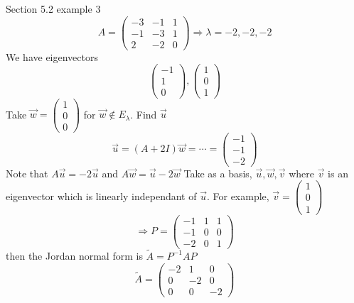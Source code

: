 \documentclass{article}
\numberwithin{equation}{section}
\begin{document}
\begin{eg}
    Section 5.2 example 3
    \[
        A = \begin{pmatrix}
            -3 & -1 & 1 \\
            -1 & -3 & 1 \\
            2 & -2 & 0
        \end{pmatrix} \Rightarrow \lambda = -2, -2, -2
    \]
    We have eigenvectors
    \[
        \begin{pmatrix}
            -1 \\ 1 \\ 0
        \end{pmatrix}, 
        \begin{pmatrix}
            1 \\ 0 \\ 1
        \end{pmatrix}
    \]
    Take $\vec w = \begin{pmatrix}
        1 \\ 0 \\ 0
    \end{pmatrix}$ for $\vec w \notin E_\lambda$. Find $\vec u$
    \[
        \vec u = (A + 2I)\vec w = \cdots = \begin{pmatrix}
            -1 \\ -1 \\ -2
        \end{pmatrix}
    \]
    Note that $A \vec u = -2 \vec u$ and $A \vec w = \vec u - 2 \vec w$
    Take as a basis, $\vec u, \vec w, \vec v$ where $\vec v$ is an eigenvector which is linearly independant of $\vec u$.
    For example, $\vec v = \begin{pmatrix}
        1 \\ 0 \\ 1
    \end{pmatrix}$
    \[
        \Rightarrow P = \begin{pmatrix}
            -1 & 1 & 1 \\
            -1 & 0 & 0 \\
            -2 & 0 & 1
        \end{pmatrix}  
    \]
    then the Jordan normal form is $\tilde{A} = P^{-1} A P$
    \[
        \tilde{A} = \begin{pmatrix}
            -2 & 1 & 0 \\
            0 & -2 & 0 \\
            0 & 0 & -2
        \end{pmatrix}  
    \]
\end{eg}
\end{document}
